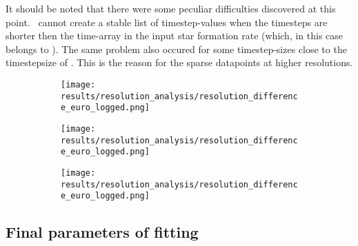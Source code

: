It should be noted that there were some peculiar difficulties discovered at this point. \omegamodel\ cannot create a stable list of timestep-values when the timesteps are shorter then the time-array in the input star formation rate (which, in this case belongs to \eris). The same problem also occured for some timestep-sizes close to the timestepsize of \eris.
This is the reason for the sparse datapoints at higher resolutions.

\begin{figure}
  \centering
  \begin{subfigure}
    \centering
    \texttt{[image: results/resolution\_analysis/resolution\_difference\_euro\_logged.png]}
    \caption{\label{fig:fit-res-euro}}
  \end{subfigure}
  \begin{subfigure}
    \centering
    \texttt{[image: results/resolution\_analysis/resolution\_difference\_euro\_logged.png]}
    \caption{\label{fig:fit-res-euro}}
  \end{subfigure}
  \begin{subfigure}
    \centering
    \texttt{[image: results/resolution\_analysis/resolution\_difference\_euro\_logged.png]}
    \caption{\label{fig:fit-res-euro}}
  \end{subfigure}
\end{figure}

\FloatBarrier
\subsection{Final parameters of fitting}

